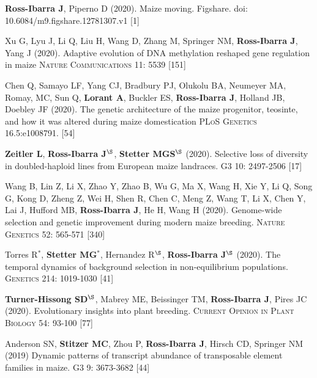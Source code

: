 \documentclass[letterpaper,10pt]{article}
\begin{document}
\begin{etaremune}
\item \textbf{Ross-Ibarra J}, Piperno D (2020). Maize moving. Figshare. doi: 10.6084/m9.figshare.12781307.v1 [1] 


\item Xu G, Lyu J, Li Q, Liu H, Wang D, Zhang M, Springer NM, \textbf{Ross-Ibarra J}, Yang J (2020). Adaptive evolution of DNA methylation reshaped gene regulation in maize \textsc{Nature Communications} 11: 5539
{} [151]\\

\item Chen Q, Samayo LF, Yang CJ, Bradbury PJ, Olukolu BA, Neumeyer MA, Romay, MC, Sun Q, \textbf{Lorant A}, Buckler ES, \textbf{Ross-Ibarra J}, Holland JB, Doebley JF (2020).
The genetic architecture of the maize progenitor, teosinte, and how it was altered during maize domestication \textsc{PLoS Genetics} 16.5:e1008791.
{} [54]\\

\item \textbf{Zeitler L}, \textbf{Ross-Ibarra J}$^\S$, \textbf{Stetter MGS}$^\S$ (2020). Selective loss of diversity in doubled-haploid lines from European maize landraces. \textsc{G3} 10: 2497-2506
{} [17]\\

\item Wang B, Lin Z, Li X, Zhao Y, Zhao B, Wu G, Ma X, Wang H, Xie Y, Li Q, Song G, Kong D, Zheng Z, Wei H, Shen R, Chen C, Meng Z, Wang T, Li X, Chen Y, Lai J, Hufford MB, \textbf{Ross-Ibarra J}, He H, Wang H (2020). Genome-wide selection and genetic improvement during modern maize breeding. \textsc{Nature Genetics} 52: 565-571
{} [340]\\

\item Torres R$^*$, \textbf{Stetter MG}$^*$, Hernandez R$^\S$, \textbf{Ross-Ibarra J}$^\S$ (2020). The temporal dynamics of background selection in non-equilibrium populations. \textsc{Genetics} 214: 1019-1030
{} [41]\\

\item \textbf{Turner-Hissong SD}$^\S$, Mabrey ME, Beissinger TM, \textbf{Ross-Ibarra J}, Pires JC (2020). Evolutionary insights into plant breeding. \textsc{Current Opinion in Plant Biology} 54: 93-100
{} [77]\\

\item  Anderson SN, \textbf{Stitzer MC},  Zhou P, \textbf{Ross-Ibarra J}, Hirsch CD, Springer NM (2019) Dynamic patterns of transcript abundance of transposable element families in maize. \textsc{G3} 9: 3673-3682
{} [44]\\


\end{etaremune}
\end{document}

